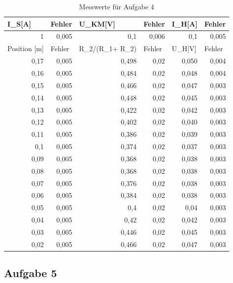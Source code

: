 \documentclass[12pt]{scrartcl}
\begin{document}
\begin{table}[htbp]
\caption{Messwerte für Aufgabe 4}
\begin{center}
\begin{tabular}{|r|r|r|r|r|r|}
\hline
\multicolumn{1}{|l|}{I\_S[A]} & \multicolumn{1}{l|}{Fehler} & \multicolumn{1}{l|}{U\_KM[V]} & \multicolumn{1}{l|}{Fehler} & \multicolumn{1}{l|}{I\_H[A]} & \multicolumn{1}{l|}{Fehler} \\ \hline
1 & 0,005 & 0,1 & 0,006 & 0,1 & 0,005 \\ \hline
\multicolumn{1}{|l|}{Position [m]} & \multicolumn{1}{l|}{Fehler} & \multicolumn{1}{l|}{R\_2/(R\_1+ R\_2)} & \multicolumn{1}{l|}{Fehler} & \multicolumn{1}{l|}{U\_H[V]} & \multicolumn{1}{l|}{Fehler} \\ \hline
0,17 & 0,005 & 0,498 & 0,02 & 0,050 & 0,004 \\ \hline
0,16 & 0,005 & 0,484 & 0,02 & 0,048 & 0,004 \\ \hline
0,15 & 0,005 & 0,466 & 0,02 & 0,047 & 0,003 \\ \hline
0,14 & 0,005 & 0,448 & 0,02 & 0,045 & 0,003 \\ \hline
0,13 & 0,005 & 0,422 & 0,02 & 0,042 & 0,003 \\ \hline
0,12 & 0,005 & 0,402 & 0,02 & 0,040 & 0,003 \\ \hline
0,11 & 0,005 & 0,386 & 0,02 & 0,039 & 0,003 \\ \hline
0,1 & 0,005 & 0,374 & 0,02 & 0,037 & 0,003 \\ \hline
0,09 & 0,005 & 0,368 & 0,02 & 0,038 & 0,003 \\ \hline
0,08 & 0,005 & 0,368 & 0,02 & 0,038 & 0,003 \\ \hline
0,07 & 0,005 & 0,376 & 0,02 & 0,038 & 0,003 \\ \hline
0,06 & 0,005 & 0,384 & 0,02 & 0,038 & 0,003 \\ \hline
0,05 & 0,005 & 0,4 & 0,02 & 0,04 & 0,003 \\ \hline
0,04 & 0,005 & 0,42 & 0,02 & 0,042 & 0,003 \\ \hline
0,03 & 0,005 & 0,446 & 0,02 & 0,045 & 0,003 \\ \hline
0,02 & 0,005 & 0,466 & 0,02 & 0,047 & 0,003\\ \hline
\end{tabular}
\end{center}
\label{aufgabe_4}
\end{table}

\newpage

\subsection{Aufgabe 5}
\end{document}
